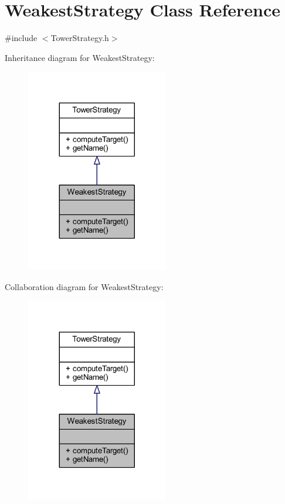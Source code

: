 \hypertarget{class_weakest_strategy}{\section{Weakest\+Strategy Class Reference}
\label{class_weakest_strategy}
}


{\ttfamily \#include $<$Tower\+Strategy.\+h$>$}



Inheritance diagram for Weakest\+Strategy\+:
\nopagebreak
\begin{figure}[H]
\begin{center}
\leavevmode
\includegraphics[width=176pt]{class_weakest_strategy__inherit__graph}
\end{center}
\end{figure}


Collaboration diagram for Weakest\+Strategy\+:
\nopagebreak
\begin{figure}[H]
\begin{center}
\leavevmode
\includegraphics[width=176pt]{class_weakest_strategy__coll__graph}
\end{center}
\end{figure}
